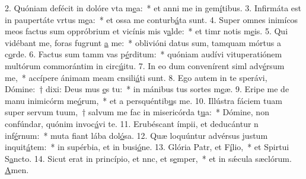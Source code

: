 2. Quóniam defécit in dolóre vta m\uline{e}a:~* et anni me in gem\uline{í}tibus.
3. Infirmáta est in paupertáte vrtus m\uline{e}a:~* et ossa me conturb\uline{á}ta sunt.
4. Super omnes inimícos meos factus sum oppróbrium et vicínis mis v\uline{a}lde:~* et timr notis m\uline{e}is.
5. Qui vidébant me, foras fugrunt \uline{a} me:~* oblivióni datus sum, tamquam mórtus a c\uline{o}rde.
6. Factus sum tamm vas p\uline{é}rditum:~* quóniam audívi vituperatiónem multórum commorántim in circ\uline{ú}itu.
7. In eo dum convenírent siml adv\uline{é}rsum me,~* accípere ánimam meam cnsili\uline{á}ti sunt.
8. Ego autem in te sperávi, Dómine:~† dixi: Deus mus \uline{e}s tu:~* in mánibus tus sortes m\uline{e}æ.
9. Eripe me de manu inimicórm me\uline{ó}rum,~* et a persquéntib\uline{u}s me.
10. Illústra fáciem tuam super servum tuum,~† salvum me fac in misericórda t\uline{u}a:~* Dómine, non confúndar, quónim invoc\uline{á}vi te.
11. Erubéscant ímpii, et deducántur n inf\uline{é}rnum:~* muta fiant lába dol\uline{ó}sa.
12. Quæ loquúntur advérsus justum inquit\uline{á}tem:~* in supérbia, et in busi\uline{ó}ne.
13. Glória Patr, et F\uline{í}lio,~* et Spirtui S\uline{a}ncto.
14. Sicut erat in princípio, et nnc, et s\uline{e}mper,~* et in sǽcula sæclórum. \uline{A}men.
